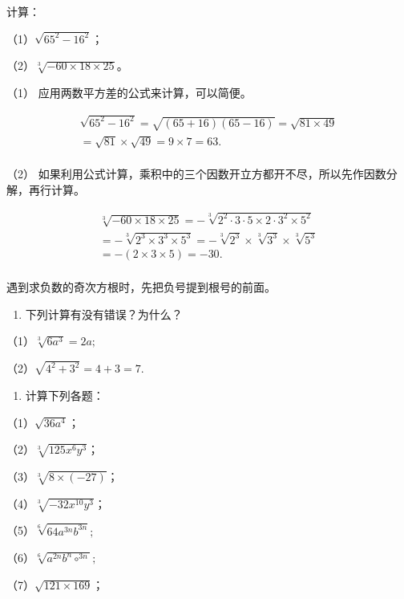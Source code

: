 计算：

（1）\(\sqrt{65^2 - 16^2}\)；

（2）\(\sqrt[3]{-60 \times 18 \times 25}\)。

 （1） 应用两数平方差的公式来计算，可以简便。

\[
\begin{array}{l} \sqrt {65 ^ {2} - 16 ^ {2}} = \sqrt {(65 + 16) (65 - 16)} = \sqrt {81 \times 49} \\ = \sqrt {81} \times \sqrt {49} = 9 \times 7 = 63. \\ \end{array}
\]

（2）
如果利用公式计算，乘积中的三个因数开立方都开不尽，所以先作因数分解，再行计算。

\[
\begin{array}{l} \sqrt[3]{- 60 \times 18 \times 25} = - \sqrt[3]{2 ^ {2} \cdot 3 \cdot 5 \times 2 \cdot 3 ^ {2} \times 5 ^ {2}} \\ = - \sqrt[3]{2 ^ {3} \times 3 ^ {3} \times 5 ^ {3}} = - \sqrt[3]{2 ^ {3}} \times \sqrt[3]{3 ^ {3}} \times \sqrt[3]{5 ^ {3}} \\ = - (2 \times 3 \times 5) = - 30. \\ \end{array}
\]

 遇到求负数的奇次方根时，先把负号提到根号的前面。

\begin{enumerate}
\item
  下列计算有没有错误？为什么？
\end{enumerate}

（1）\(\sqrt[3]{6a^3} = 2a;\)

（2）\(\sqrt{4^2 + 3^2} = 4 + 3 = 7.\)

\begin{enumerate}[start=2]
\item
  计算下列各题：
\end{enumerate}

（1）\(\sqrt{36a^4}\)；

（2）\(\sqrt[3]{125x^6y^3}\)；

（3）\(\sqrt[3]{8 \times (-27)}\)；

（4）\(\sqrt[3]{-32x^{10}y^3}\)；

（5）\(\sqrt[6]{64a^{3n}b^{3n}};\)

（6）\(\sqrt[6]{a^{2n}b^{n}\circ^{3n}};\)

（7）\(\sqrt{121 \times 169}\)；

